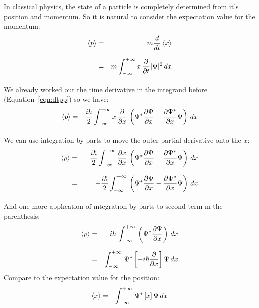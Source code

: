\documentclass[12pt]{book}
\begin{document}
In classical physics, the state of a particle is completely determined from it's position and momentum.  So it is natural to consider the expectation value for the momentum: 
\begin{eqnarray*}
\braket{p} &=& m \frac{d}{dt} \braket{x} \\[7pt] 
&=& m \int_{-\infty}^{+\infty} x \, \frac{\partial}{\partial t} |\Psi|^2 \,dx \\[7pt]
\end{eqnarray*}
We already worked out the time derivative in the integrand before (Equation~\ref{eqn:dtpp}) so we have:
\begin{eqnarray*}
\braket{p} &=&  \frac{i \hbar}{2} \int_{-\infty}^{+\infty} x \, \frac{\partial}{\partial x} \, \left( \Psi^*  \frac{\partial \Psi}{\partial x}  -  \frac{\partial \Psi^*}{\partial x}  \Psi\right) \,dx \\[7pt]
\end{eqnarray*}
We can use integration by parts to move the outer partial derivative onto the $x$:
\begin{eqnarray*}
\braket{p} &=&  -\frac{i \hbar}{2} \int_{-\infty}^{+\infty} \frac{\partial x}{\partial x} \, \left( \Psi^*  \frac{\partial \Psi}{\partial x}  -  \frac{\partial \Psi^*}{\partial x}  \Psi\right) \,dx \\[7pt]
&=&  -\frac{i \hbar}{2} \int_{-\infty}^{+\infty} \, \left( \Psi^*  \frac{\partial \Psi}{\partial x}  -  \frac{\partial \Psi^*}{\partial x}  \Psi\right) \,dx \\[7pt]
\end{eqnarray*}
And one more application of integration by parts to second term in the parenthesis:
\begin{eqnarray}
\braket{p} &=&  -i \hbar \, \int_{-\infty}^{+\infty} \, \left( \Psi^*  \frac{\partial \Psi}{\partial x}  \right) \,dx \notag \\[7pt]
 &=& \int_{-\infty}^{+\infty} \, \Psi^* \left[ -i \hbar \frac{\partial}{\partial x}\right] \Psi \,dx 
\label{eqn:derivpop} \end{eqnarray}
Compare to the expectation value for the position:
\begin{eqnarray}
\braket{x} 
 &=& \int_{-\infty}^{+\infty} \, \Psi^* \left[ x \right] \Psi \,dx 
\end{eqnarray}
\end{document}
